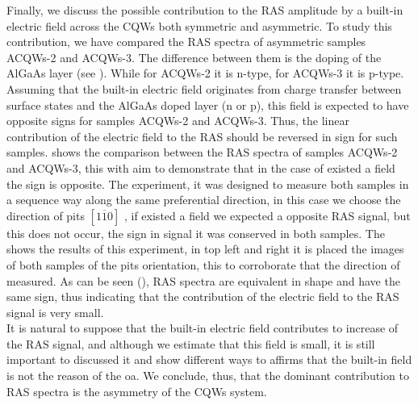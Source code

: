 Finally, we discuss the possible contribution to the RAS amplitude by a built-in electric field across the \gls{CQWs} both symmetric and asymmetric. To study this contribution, we have compared the RAS spectra of asymmetric samples \gls{ACQWs}-2 and \gls{ACQWs}-3. The difference between them is the doping of the AlGaAs layer (see ). While for \gls{ACQWs}-2 it is n-type, for \gls{ACQWs}-3 it is p-type. Assuming that the built-in electric field  originates from charge transfer between surface states and  the AlGaAs doped layer (n or p), this field is expected to have opposite signs for samples \gls{ACQWs}-2 and \gls{ACQWs}-3. Thus, the linear contribution of the electric field to the \gls{RAS} should be reversed in sign for such samples.  shows the comparison between the \gls{RAS} spectra of samples \gls{ACQWs}-2 and \gls{ACQWs}-3,  this with aim to demonstrate that  in the case of existed a field the sign is opposite.    The experiment, it was designed to measure both samples in a sequence way along the same preferential direction, in this case we choose the direction of pits $\left[1\overline{1}0\right]$ \cite{weyher2010defect}, if existed a field we expected a opposite RAS signal, but this does not occur, the sign in signal it was conserved in both samples. The  shows the results of this experiment, in top left and right it is placed the images of both samples of the pits orientation, this to corroborate that the direction of measured. 
As can be seen (), RAS spectra are equivalent in shape and have the same sign, thus indicating that the contribution of the electric field to the \gls{RAS} signal is very small. \\
It is natural to suppose that the built-in electric field contributes to increase of the \gls{RAS} signal, and although  we estimate that this field is small, it is still important to discussed it and show different ways to affirms that  the built-in field is not the reason of the \gls{oa}. 
We conclude, thus, that the dominant contribution to \gls{RAS} spectra is the asymmetry of the \gls{CQWs} system. 

